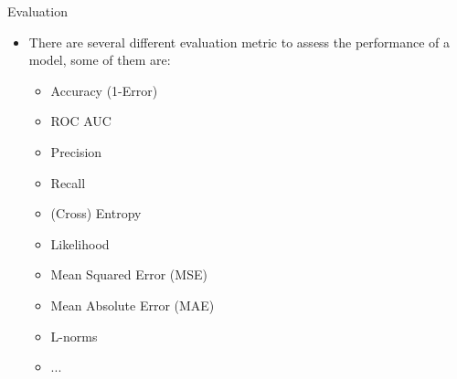 \documentclass[compress,oilve]{beamer}
\begin{document}
\begin{frame}{Evaluation}
\begin{itemize}
\item There are several different evaluation metric to assess the performance of a
model, some of them are:
	\begin{itemize}
		\item Accuracy (1-Error)
                   \item ROC AUC
                   \item Precision
                   \item Recall
                    \item (Cross) Entropy
                   \item Likelihood
                    \item Mean Squared Error (MSE)
		\item Mean Absolute Error (MAE)
                    \item L-norms
                   \item ...
	\end{itemize}
\end{itemize}
\end{frame}
\end{document}
